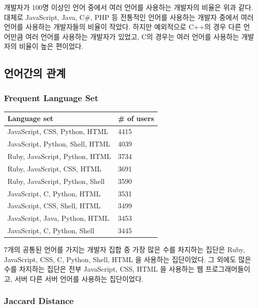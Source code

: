 \documentclass[10pt, a4paper, titlepage]{article}
\begin{document}
개발자가 100명 이상인 언어 중에서 여러 언어를 사용하는 개발자의 비율은 위과 같다. 대체로 JavaScript, Java, C\#, PHP 등 전통적인 언어를 사용하는 개발자 중에서 여러 언어를 사용하는 개발자들의 비율이 작았다. 하지만 예외적으로 C++의 경우 다른 언어만큼 여러 언어를 사용하는 개발자가 있었고, C의 경우는 여러 언어를 사용하는 개발자의 비율이 높은 편이었다.

\FloatBarrier

\subsection{언어간의 관계}

\subsubsection{Frequent Language Set}

\begin{longtable}{|l|l|}
\hline
\rowcolor[gray]{0.8}
Language set & \# of users \\
\hline

JavaScript, CSS, Python, HTML &
4415 \\ \hline
JavaScript, Python, Shell, HTML &
4039 \\ \hline
Ruby, JavaScript, Python, HTML &
3734 \\ \hline
Ruby, JavaScript, CSS, HTML &
3691 \\ \hline
Ruby, JavaScript, Python, Shell &
3590 \\ \hline
JavaScript, C, Python, HTML &
3531 \\ \hline
JavaScript, CSS, Shell, HTML &
3499 \\ \hline
JavaScript, Java, Python, HTML &
3453 \\ \hline
JavaScript, C, Python, Shell &
3445 \\ \hline

\end{longtable}

7개의 공통된 언어를 가지는 개발자 집합 중 가장 많은 수를 차지하는 집단은 Ruby, JavaScript, CSS, C, Python, Shell, HTML 을 사용하는 집단이었다. 그 외에도 많은 수를 차지하는 집단은 전부 JavaScript, CSS, HTML 을 사용하는 웹 프로그래머들이고, 서버 다른 서버 언어를 사용하는 집단이었다.


\subsubsection{Jaccard Distance}
\end{document}
